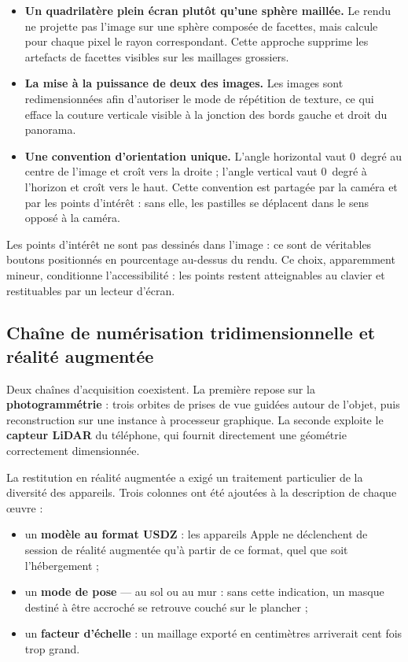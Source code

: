 \begin{itemize}
  \item \textbf{Un quadrilatère plein écran plutôt qu'une sphère maillée.} Le
        rendu ne projette pas l'image sur une sphère composée de facettes, mais
        calcule pour chaque pixel le rayon correspondant. Cette approche
        supprime les artefacts de facettes visibles sur les maillages grossiers.

  \item \textbf{La mise à la puissance de deux des images.} Les images sont
        redimensionnées afin d'autoriser le mode de répétition de texture, ce
        qui efface la couture verticale visible à la jonction des bords gauche
        et droit du panorama.

  \item \textbf{Une convention d'orientation unique.} L'angle horizontal vaut
        0~degré au centre de l'image et croît vers la droite ; l'angle vertical
        vaut 0~degré à l'horizon et croît vers le haut. Cette convention est
        partagée par la caméra et par les points d'intérêt : sans elle, les
        pastilles se déplacent dans le sens opposé à la caméra.
\end{itemize}

Les points d'intérêt ne sont pas dessinés dans l'image : ce sont de véritables
boutons positionnés en pourcentage au-dessus du rendu. Ce choix, apparemment
mineur, conditionne l'accessibilité : les points restent atteignables au clavier
et restituables par un lecteur d'écran.

\subsection{Chaîne de numérisation tridimensionnelle et réalité augmentée}

Deux chaînes d'acquisition coexistent. La première repose sur la
\textbf{photogrammétrie} : trois orbites de prises de vue guidées autour de
l'objet, puis reconstruction sur une instance à processeur graphique. La
seconde exploite le \textbf{capteur LiDAR} du téléphone, qui fournit directement
une géométrie correctement dimensionnée.

La restitution en réalité augmentée a exigé un traitement particulier de la
diversité des appareils. Trois colonnes ont été ajoutées à la description de
chaque œuvre :

\begin{itemize}
  \item un \textbf{modèle au format USDZ} : les appareils Apple ne déclenchent
        de session de réalité augmentée qu'à partir de ce format, quel que soit
        l'hébergement ;
  \item un \textbf{mode de pose} — au sol ou au mur : sans cette indication, un
        masque destiné à être accroché se retrouve couché sur le plancher ;
  \item un \textbf{facteur d'échelle} : un maillage exporté en centimètres
        arriverait cent fois trop grand.
\end{itemize}

